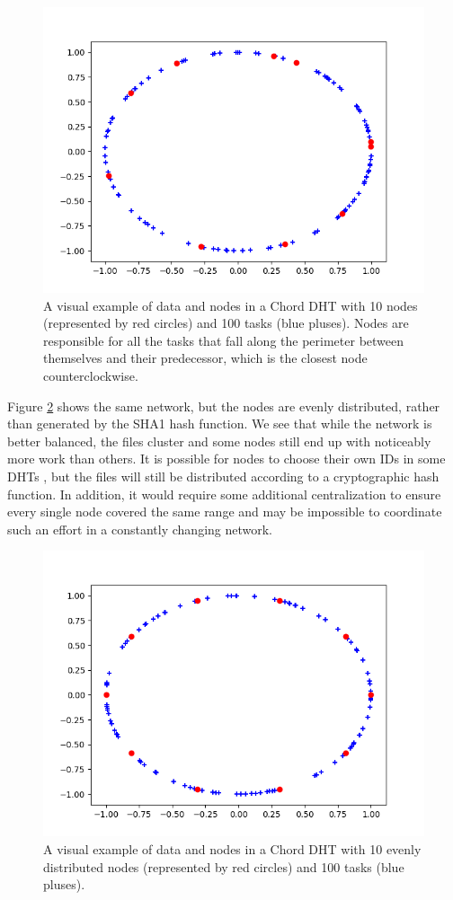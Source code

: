 \documentclass[11pt,conference]{IEEEtran}
\begin{document}
\begin{figure}
	\centering
	\includegraphics[width=0.7\linewidth]{figs/exampleChordUnevenRedone}
	\caption[Distribution of Nodes and Tasks in a Chord DHT]{A visual example of data and nodes in a Chord DHT with 10 nodes (represented by red circles) and 100 tasks (blue pluses). Nodes are responsible for all the tasks that fall along the perimeter between themselves and their predecessor, which is the closest node counterclockwise.}
	\label{fig:exampleChordDistribution}
\end{figure}

Figure \ref{fig:exampleChordEvenDistribution} shows the same network, but the nodes are evenly distributed, rather than generated by the SHA1 hash function.
We see that while the network is better balanced, the files cluster and some nodes still end up with noticeably more work than others.
It is possible for nodes to choose their own IDs in some DHTs \cite{mainline}, but the files will still be distributed according to a cryptographic hash function.
In addition, it would require some additional centralization to ensure every single node covered the same range and may be impossible to coordinate such an effort in a constantly changing network.



\begin{figure}
	\centering
	\includegraphics[width=0.7\linewidth]{figs/exampleChordEvenRedone}
	\caption[Distribution of Tasks in a Chord DHT  with Evenly Distributed Nodes]{A visual example of data and nodes in a Chord DHT with 10 evenly distributed nodes (represented by red circles) and 100 tasks (blue pluses).}
	\label{fig:exampleChordEvenDistribution}
\end{figure}
\end{document}
